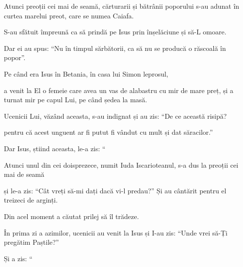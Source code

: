 {\par }{\PP {}Atunci preoții cei mai de seamă, cărturarii și bătrânii poporului s-au adunat în curtea marelui preot, care se numea Caiafa.

S-au sfătuit împreună ca să prindă pe Isus prin înșelăciune și să-L omoare.

Dar ei au spus: “Nu în timpul sărbătorii, ca să nu se producă o răscoală în popor”.


\par }{\PP {}Pe când era Isus în Betania, în casa lui Simon leprosul,

a venit la El o femeie care avea un vas de alabastru cu mir de mare preț, și a turnat mir pe capul Lui, pe când ședea la masă.

Ucenicii Lui, văzând aceasta, s-au indignat și au zis: “De ce această risipă?

pentru că acest unguent ar fi putut fi vândut cu mult și dat săracilor.”


\par }{\PP {}Dar Isus, știind aceasta, le-a zis: “{}





\par }{\PP {}Atunci unul din cei doisprezece, numit Iuda Iscarioteanul, s-a dus la preoții cei mai de seamă

și le-a zis: “Cât vreți să-mi dați dacă vi-l predau?” Și au cântărit pentru el treizeci de arginți.

Din acel moment a căutat prilej să îl trădeze.


\par }{\PP {}În prima zi a azimilor, ucenicii au venit la Isus și I-au zis: “Unde vrei să-Ți pregătim Paștile?”


\par }{\PP {}Și a zis: “{}


}
